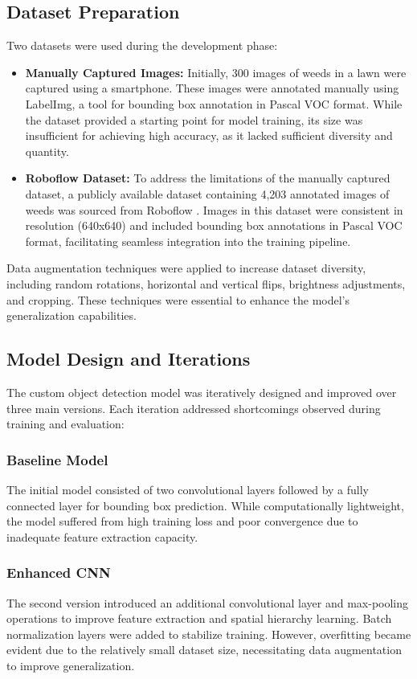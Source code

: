 \documentclass[conference]{IEEEtran}
\begin{document}
\subsection{Dataset Preparation}
Two datasets were used during the development phase:
\begin{itemize}
    \item \textbf{Manually Captured Images:} Initially, 300 images of weeds in a lawn were captured using a smartphone. These images were annotated manually using LabelImg, a tool for bounding box annotation in Pascal VOC format. While the dataset provided a starting point for model training, its size was insufficient for achieving high accuracy, as it lacked sufficient diversity and quantity.
    \item \textbf{Roboflow Dataset:} To address the limitations of the manually captured dataset, a publicly available dataset containing 4,203 annotated images of weeds was sourced from Roboflow \cite{ahmed2024imageweed}. Images in this dataset were consistent in resolution (640x640) and included bounding box annotations in Pascal VOC format, facilitating seamless integration into the training pipeline.
\end{itemize}

Data augmentation techniques were applied to increase dataset diversity, including random rotations, horizontal and vertical flips, brightness adjustments, and cropping. These techniques were essential to enhance the model's generalization capabilities.

\subsection{Model Design and Iterations}
The custom object detection model was iteratively designed and improved over three main versions. Each iteration addressed shortcomings observed during training and evaluation:

\subsubsection{Baseline Model}
The initial model consisted of two convolutional layers followed by a fully connected layer for bounding box prediction. While computationally lightweight, the model suffered from high training loss and poor convergence due to inadequate feature extraction capacity.

\subsubsection{Enhanced CNN}
The second version introduced an additional convolutional layer and max-pooling operations to improve feature extraction and spatial hierarchy learning. Batch normalization layers were added to stabilize training. However, overfitting became evident due to the relatively small dataset size, necessitating data augmentation to improve generalization.
\end{document}
